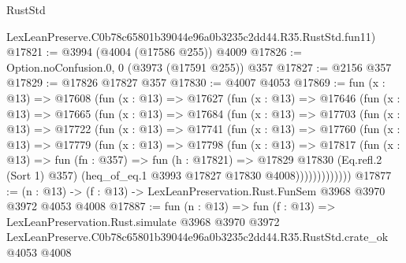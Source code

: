 \begin{lexlean}{RustStd}
\begin{coremodule}
    LexLeanPreserve.C0b78c65801b39044e96a0b3235c2dd44.R35.RustStd.fun11)
@17821 := @3994 (@4004 (@17586 @255)) @4009
@17826 := Option.noConfusion.{0, 0} (@3973 (@17591 @255)) @357
@17827 := @2156 @357
@17829 := @17826 @17827 @357
@17830 := @4007 @4053
@17869 := fun (x : @13) =>
  @17608
    (fun (x : @13) =>
    @17627
      (fun (x : @13) =>
      @17646
        (fun (x : @13) =>
        @17665
          (fun (x : @13) =>
          @17684
            (fun (x : @13) =>
            @17703
              (fun (x : @13) =>
              @17722
                (fun (x : @13) =>
                @17741
                  (fun (x : @13) =>
                  @17760
                    (fun (x : @13) =>
                    @17779
                      (fun (x : @13) =>
                      @17798
                        (fun (x : @13) =>
                        @17817
                          (fun (x : @13) =>
                          fun (fn : @357) =>
                          fun (h : @17821) =>
                          @17829
                            @17830
                            (Eq.refl.{2} (Sort 1) @357)
                            (heq_of_eq.{1} @3993 @17827 @17830 @4008)))))))))))))
@17877 := (n : @13) -> (f : @13) -> LexLeanPreservation.Rust.FunSem @3968 @3970 @3972 @4053 @4008
@17887 := fun (n : @13) =>
  fun (f : @13) =>
  LexLeanPreservation.Rust.simulate
    @3968
    @3970
    @3972
    LexLeanPreserve.C0b78c65801b39044e96a0b3235c2dd44.R35.RustStd.crate_ok
    @4053
    @4008
\end{coremodule}
\end{lexlean}
